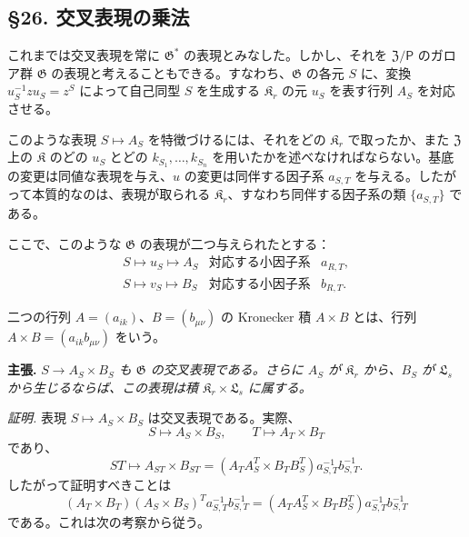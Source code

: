 \subsection*{\S 26. 交叉表現の乗法}\label{multiplikation-der-verschraenkten-darstellungen}

これまでは交叉表現を常に \(\mathfrak G^*\) の表現とみなした。しかし、それを \(\mathfrak Z/\mathsf P\) のガロア群 \(\mathfrak G\) の表現と考えることもできる。すなわち、\(\mathfrak G\) の各元 \(S\) に、変換 \(u_S^{-1}zu_S=z^S\) によって自己同型 \(S\) を生成する \(\mathfrak K_r\) の元 \(u_S\) を表す行列 \(A_S\) を対応させる。

このような表現 \(S\mapsto A_S\) を特徴づけるには、それをどの \(\mathfrak K_r\) で取ったか、また \(\mathfrak Z\) 上の \(\mathfrak K\) のどの \(u_S\) とどの \(k_{S_1},\ldots,k_{S_n}\) を用いたかを述べなければならない。基底の変更は同値な表現を与え、\(u\) の変更は同伴する因子系 \(a_{S,T}\) を与える。したがって本質的なのは、表現が取られる \(\mathfrak K_r\)、すなわち同伴する因子系の類 \(\{a_{S,T}\}\) である。

ここで、このような \(\mathfrak G\) の表現が二つ与えられたとする：
\[
\begin{array}{lll}
S\mapsto u_S\mapsto A_S
&\text{対応する小因子系}&a_{R,T},\\
S\mapsto v_S\mapsto B_S
&\text{対応する小因子系}&b_{R,T}.
\end{array}
\]

二つの行列 \(A=(a_{ik})\)、\(B=(b_{\mu\nu})\) の Kronecker 積 \(A\times B\) とは、行列 \(A\times B=(a_{ik}b_{\mu\nu})\) をいう。

\noindent\textbf{主張.} \emph{\(S\to A_S\times B_S\) も \(\mathfrak G\) の交叉表現である。さらに \(A_S\) が \(\mathfrak K_r\) から、\(B_S\) が \(\mathfrak L_s\) から生じるならば、この表現は積 \(\mathfrak K_r\times\mathfrak L_s\) に属する。}

\noindent\emph{証明.} 表現 \(S\mapsto A_S\times B_S\) は交叉表現である。実際、
\[
S\mapsto A_S\times B_S,\qquad
T\mapsto A_T\times B_T
\]
であり、
\[
ST\mapsto A_{ST}\times B_{ST}
=(A_TA_S^T\times B_TB_S^T)a_{S,T}^{-1}b_{S,T}^{-1}.
\]
したがって証明すべきことは
\[
(A_T\times B_T)(A_S\times B_S)^T a_{S,T}^{-1}b_{S,T}^{-1}
=(A_TA_S^T\times B_TB_S^T)a_{S,T}^{-1}b_{S,T}^{-1}
\]
である。これは次の考察から従う。


